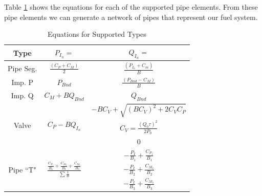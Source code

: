Table \ref{types} shows the equations for each of the supported pipe elements.  From these pipe elements we can generate a network of pipes that represent our fuel system.  
%
\begin{center}
\begin{table}
\caption{Equations for Supported Types} 
\begin{tabular}{|c|c|c|}
\hline
Type 							&$P_{I_n}=$ 										&$Q_{I_n}=$ \\ 
\hline
Pipe Seg. 						&$\frac{\left(C_P+C_M\right)}{2}$ 				&$ \frac{\left(P_{I_n}+C_m\right)}{B}$ \\ 
\hline
Imp. P 							&$\scriptstyle P_{Bnd}$ 							&$\frac{(P_{Bnd}-C_M)}{B}$ \\
\hline
Imp. Q 							&$\scriptstyle C_M+BQ_{Bnd}$ 					&$ \scriptstyle Q_{Bnd}$ \\
\hline
\multirow{3}{*}{Valve} 		&\multirow{3}{*}{$\scriptstyle C_P-BQ_{I_n}$}	&$\scriptstyle -BC_V+\sqrt{(BC_V)^2+2C_VC_P}$ \\ 
 								&													&$\scriptstyle C_V=\frac{(Q_0 \tau)^2}{2P_0}$\\ 
\hline
Cap 							&$\scriptstyle C_P-BQ_{I_n}$ 					&$\scriptstyle 0$ \\ 
\hline
\multirow{3}{*}{Pipe ``T"} 	&\multirow{3}{*}{$\frac{\frac{C_{P_1}}{B_1}+\frac{C_{M_2}}{B_2}+\frac{C_{M_3}}{B_3}}{\sum \frac{1}{B}}$} &$-\frac{P_I}{B_1}+\frac{C_{P_1}}{B_1}$ \\ 
 								&  													&$-\frac{P_I}{B_2}+\frac{C_{M_2}}{B_2}$\\ 
 								& 													&$-\frac{P_I}{B_3}+\frac{C_{M_3}}{B_3}$\\ 
\hline
\end{tabular}
\label{types}
\end{table}
\end{center}

